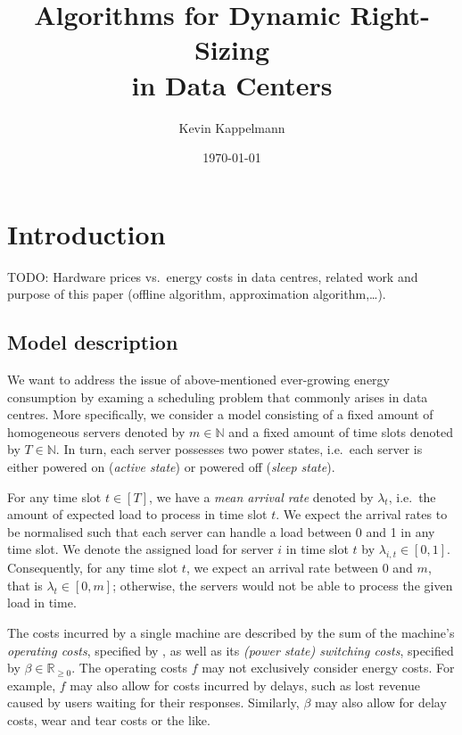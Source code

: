 \documentclass[hidelinks]{article}
\title{\textbf{Algorithms for Dynamic Right-Sizing\\in Data Centers}}
\author{Kevin Kappelmann}
\affil{Chair for Theoretical Computer Science,\\ Technical University of Munich}
\date{\today}
\theoremstyle{plain}
\theoremstyle{definition}
\theoremstyle{rem}
\begin{document}
\maketitle
\newpage
\tableofcontents 
\newpage


\section{Introduction}
TODO: Hardware prices vs.\ energy costs in data centres, related work and purpose of this paper (offline algorithm, approximation algorithm,\ldots).

\subsection{Model description}\label{sec_model_descr}
We want to address the issue of above-mentioned ever-growing energy consumption by examing a scheduling problem that commonly arises in data centres. More specifically, we consider a model consisting of a fixed amount of homogeneous servers denoted by $m\in\mathbb{N}$ and a fixed amount of time slots denoted by $T\in\mathbb{N}$. In turn, each server possesses two power states, i.e.\ each server is either powered on (\textit{active state}) or powered off (\textit{sleep state}).
	
For any time slot $t\in[T]$, we have a \textit{mean arrival rate} denoted by $\lambda_t$, i.e.\ the amount of expected load to process in time slot $t$. We expect the arrival rates to be normalised such that each server can handle a load between 0 and 1 in any time slot. We denote the assigned load for server $i$ in time slot $t$ by $\lambda_{i,t}\in[0,1]$. Consequently, for any time slot $t$, we expect an arrival rate between 0 and $m$, that is $\lambda_t\in[0,m]$; otherwise, the servers would not be able to process the given load in time.

The costs incurred by a single machine are described by the sum of the machine's \textit{operating costs}, specified by , as well as its \textit{(power state) switching costs}, specified by $\beta\in\mathbb{R}_{\ge 0}$. 
The operating costs $f$ may not exclusively consider energy costs. For example, $f$ may also allow for costs incurred by delays, such as lost revenue caused by users waiting for their responses. Similarly, $\beta$ may also allow for delay costs, wear and tear costs or the like.\cite{dyn_right_size}
\end{document}
